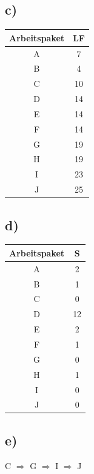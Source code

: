 \documentclass[a4paper]{report}
\begin{document}
\subsection*{c)}

\begin{center}
\begin{tabular}{ |c|c| } 
 \hline
 Arbeitspaket & LF \\ \hline
 A & 7 \\ 
 B & 4 \\ 
 C & 10 \\ 
 D & 14 \\ 
 E & 14 \\ 
 F & 14\\ 
 G & 19 \\ 
 H & 19\\ 
 I & 23 \\
 J & 25 \\
 \hline
\end{tabular}
\end{center}

\subsection*{d)}

\begin{center}
\begin{tabular}{ |c|c| } 
 \hline
 Arbeitspaket & S \\ \hline
 A & 2 \\ 
 B & 1 \\ 
 C & 0 \\ 
 D & 12 \\ 
 E & 2 \\ 
 F & 1 \\ 
 G & 0 \\ 
 H & 1 \\ 
 I & 0 \\
 J & 0 \\
 \hline
\end{tabular}
\end{center}

\subsection*{e)}

C $\Rightarrow$ G $\Rightarrow$ I $\Rightarrow$ J
\end{document}
